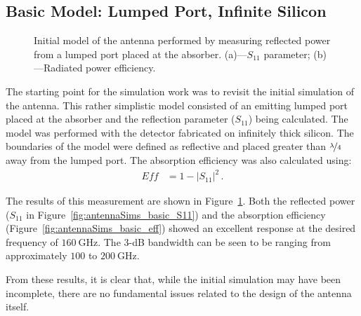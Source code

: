 \subsection{Basic Model: Lumped Port, Infinite Silicon}
\label{ssec:antennaSims_basic}
\begin{figure}[tb]
\begin{center}
\caption[Initial model of the antenna, performed by measuring reflected power]{Initial model of the antenna performed by measuring reflected power from a lumped port placed at the absorber. (a)---$S_{11}$ parameter; (b)---Radiated power efficiency.}
\label{fig:antennaSims_basic}
\end{center}
\end{figure}
The starting point for the simulation work was to revisit the initial simulation of the antenna. This rather simplistic model consisted of an emitting lumped port placed at the absorber and the reflection parameter ($S_{11}$) being calculated. The model was performed with the detector fabricated on infinitely thick silicon. The boundaries of the model were defined as reflective and placed greater than $\nicefrac{\lambda}{4}$ away from the lumped port. The absorption efficiency was also calculated using:
\begin{align}
\mathit{Eff} &= 1 - \left|S_{11}\right|^{2}\,.
\end{align}
\par 
The results of this measurement are shown in Figure~\ref{fig:antennaSims_basic}. Both the reflected power ($S_{11}$ in Figure~\ref{fig:antennaSims_basic_S11}) and the absorption efficiency (Figure~\ref{fig:antennaSims_basic_eff}) showed an excellent response at the desired frequency of $160~\mathrm{GHz}$. The 3-dB bandwidth can be seen to be ranging from approximately $100$ to $200~\mathrm{GHz}$.
\par 
From these results, it is clear that, while the initial simulation may have been incomplete, there are no fundamental issues related to the design of the antenna itself.
%
